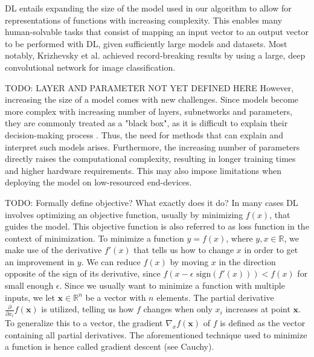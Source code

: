 
DL entails expanding the size of the model used in our algorithm to allow for representations of functions with increasing complexity. This enables many human-solvable tasks that consist of mapping an input vector to an output vector to be performed with DL, given sufficiently large models and datasets. Most notably, Krizhevsky et al. \cite{krizhevsky2012imagenet} achieved record-breaking results by using a large, deep convolutional network for image classification.

TODO: LAYER AND PARAMETER NOT YET DEFINED HERE
However, increasing the size of a model comes with new challenges. Since models become more complex with increasing number of layers, subnetworks and parameters, they are commonly treated as a "black box", as it is difficult to explain their decision-making process \cite{noor2024survey}. Thus, the need for methods that can explain and interpret such models arises. Furthermore, the increasing number of parameters directly raises the computational complexity, resulting in longer training times and higher hardware requirements. This may also impose limitations when deploying the model on low-resourced end-devices.

TODO: Formally define objective? What exactly does it do?
In many cases DL involves optimizing an objective function, usually by minimizing $f(x)$, that guides the model. This objective function is also referred to as loss function in the context of minimization. %
To minimize a function $y = f(x)$, where $y,x \in \mathbb{R}$, we make use of the derivative $f'(x)$ that tells us how to change $x$ in order to get an improvement in $y$. We can reduce $f(x)$ by moving $x$ in the direction opposite of the sign of its derivative, since $f(x-\epsilon \text{ sign}(f'(x))) < f(x)$ for small enough $\epsilon$. Since we usually want to minimize a function with multiple inputs, we let $\mathbf{x} \in \mathbb{R}^n$ be a vector with $n$ elements. The partial derivative $\frac{\partial}{\partial x_i}f(\mathbf{x})$ is utilized, telling us how $f$ changes when only $x_i$ increases at point $\mathbf{x}$. To generalize this to a vector, the gradient $\nabla_xf(\mathbf{x})$ of $f$ is defined as the vector containing all partial derivatives. The aforementioned technique used to minimize a function is hence called gradient descent (see Cauchy\cite{cauchy1847methode}).

